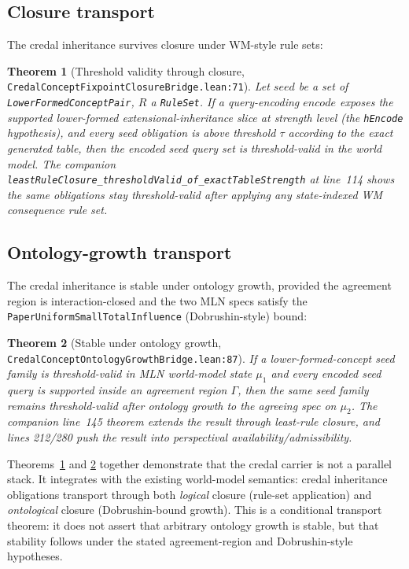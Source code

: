 \documentclass[]{article}
\newtheorem{theorem}{Theorem}
\newcommand{\lid}[1]{{\ttfamily\nolinkurl{#1}}}
\newcommand{\lpath}[1]{\texttt{\nolinkurl{#1}}}
\begin{document}
\subsection{Closure transport}\label{sec:closure-transport}

The credal inheritance survives closure under WM-style rule sets:

\begin{theorem}[Threshold validity through closure,
\lpath{CredalConceptFixpointClosureBridge.lean:71}]
\label{thm:closure-transport}
Let $\mathit{seed}$ be a set of \lid{LowerFormedConceptPair}, $R$ a \lid{RuleSet}.
If a query-encoding $\mathit{encode}$ exposes the supported lower-formed
extensional-inheritance slice at strength level (the \lid{hEncode} hypothesis),
and every seed obligation is above threshold $\tau$ according to the exact generated
table, then the encoded seed query set is threshold-valid in the world model. The
companion \lid{leastRuleClosure\_thresholdValid\_of\_exactTableStrength} at line~114
shows the same obligations stay threshold-valid after applying any state-indexed
WM consequence rule set.
\end{theorem}

\subsection{Ontology-growth transport}\label{sec:growth-transport}

The credal inheritance is stable under ontology growth, provided the agreement
region is interaction-closed and the two MLN specs satisfy the
\lid{PaperUniformSmallTotalInfluence} (Dobrushin-style) bound:

\begin{theorem}[Stable under ontology growth,
\lpath{CredalConceptOntologyGrowthBridge.lean:87}]
\label{thm:growth-transport}
If a lower-formed-concept seed family is threshold-valid in MLN world-model state
$\mu_1$ and every encoded seed query is supported inside an agreement region
$\Gamma$, then the same seed family remains threshold-valid after ontology growth
to the agreeing spec on $\mu_2$. The companion line~145 theorem extends the result
through least-rule closure, and lines 212/280 push the result into perspectival
availability/admissibility.
\end{theorem}

\noindent Theorems~\ref{thm:closure-transport} and \ref{thm:growth-transport}
together demonstrate that the credal carrier is not a parallel stack. It integrates
with the existing world-model semantics: credal inheritance obligations transport
through both \emph{logical} closure (rule-set application) and \emph{ontological}
closure (Dobrushin-bound growth).
This is a conditional transport theorem: it does not assert that arbitrary
ontology growth is stable, but that stability follows under the stated
agreement-region and Dobrushin-style hypotheses.
\end{document}
